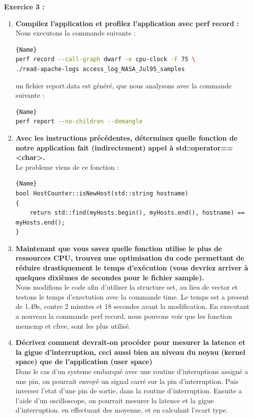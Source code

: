 \documentclass[
	a4paper, %
	10pt, %
]{CSUniSchoolLabReport}
\begin{document}

\textbf{Exercice 3 :}
\begin{enumerate}[label=\textbf{\arabic*}]

\item \textbf{Compilez l’application et profilez l’application avec perf record :}\\
Nous executons la commande suivante :
\begin{lstlisting}[language=bash, firstnumber=1]{Name}
perf record --call-graph dwarf -e cpu-clock -F 75 \
./read-apache-logs access_log_NASA_Jul95_samples
\end{lstlisting}

un fichier report.data est généré, que nous analysons avec la commande suivante :
\begin{lstlisting}[language=bash, firstnumber=1]{Name}
perf report --no-children --demangle
\end{lstlisting}
\item \textbf{Avec les instructions précédentes, déterminez quelle fonction de notre application fait (indirectement) appel à std::operator==<char>.}\\

Le probleme viens de ce fonction :
\begin{lstlisting}[style=CStyle, caption=Extrait de hostcounter.cpp, firstnumber=1]{Name}
bool HostCounter::isNewHost(std::string hostname)
{
    return std::find(myHosts.begin(), myHosts.end(), hostname) == myHosts.end();
}
\end{lstlisting}

\item \textbf{Maintenant que vous savez quelle fonction utilise le plus de ressources CPU, trouvez une optimisation du code permettant de réduire drastiquement le temps d’exécution (vous devriez arriver à quelques dixièmes de secondes pour le fichier sample).}\\
Nous modifions le code afin d'utiliser la structure set, au lieu de vector et testons le temps d'exectution avec la commande time.
Le temps est a present de 1.49s, contre 2 minutes et 18 secondes avant la modification.
En executant a nouveau la commande perf record, nous pouvons voir que les fonction memcmp et cfree, sont les plus utilisé.

\item \textbf{Décrivez comment devrait-on procéder pour mesurer la latence et la gigue d’interruption, ceci aussi bien au niveau du noyau (kernel space) que de l’application (user space)}\\
Dans le cas d'un systeme embarqué avec une routine d'interuptions assigné a une pin, on pourrait envoyé un signal carré sur la pin d'interruption.
Puis inverser l'etat d'une pin de sortie, dans la routine d'interruption.
Ensuite a l'aide d'un oscilloscope, on pourrait mesurer la latence et la gigue d'interruption. en effectuant des moyenne, et en calculant l'ecart type.
\end{enumerate}
\end{document}

